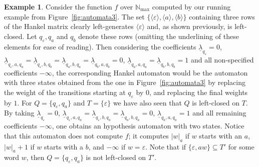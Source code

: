 \documentclass[10pt,a4paper]{amsart}
\theoremstyle{definition}
\newtheorem{exa}[thm]{Example}
\numberwithin{equation}{section}
\numberwithin{theorem}{section}
\begin{document}
 \begin{exa}
Consider the function $f$ over $\mathbb{N}_{\max}$ computed by our running example from Figure~\ref{fig:automata3}. The set $\{ \langle \varepsilon \rangle, \langle a \rangle, \langle b \rangle\}$ containing three rows of the Hankel matrix clearly left-generates $\langle \varepsilon \rangle$ and, as shown previously, is left-closed. Let $q_\varepsilon, q_a$ and $q_b$ denote these rows (omitting the underlining of these elements for ease of reading). Then considering the coefficients $\underline{\lambda}_{q_\varepsilon}=0$, $\underline{\lambda}_{q_\varepsilon,a,q_a} = \underline{\lambda}_{q_\varepsilon,b,q_b} = \underline{\lambda}_{q_a,b,q_a} = \underline{\lambda}_{q_b,a,q_b} = 0$, $\underline{\lambda}_{q_a,a, q_a} = \underline{\lambda}_{q_b,b,q_b} = 1$ and all non-specified coefficients $-\infty$, the corresponding Hankel automaton would be the automaton with three states obtained from the one in Figure~\ref{fig:automata3} by replacing the weight of the transitions starting at $q_{\varepsilon}$ by $0$, and replacing the final weights by $1$. For $Q = \{q_\varepsilon, q_ a\}$ and $T = \{\varepsilon\}$ we have also seen that $Q$ is left-closed on $T$. By taking $\underline{\lambda}_{q_\varepsilon}=0$, $\underline{\lambda}_{q_\varepsilon,a,q_a} = \underline{\lambda}_{q_\varepsilon,b,q_a} = \underline{\lambda}_{q_a,b,q_a} = 0$, $\underline{\lambda}_{q_a,a, q_a} = 1$ and all remaining coefficients $-\infty$, one obtains an hypothesis automaton with two states. Notice that this automaton does not compute $f$; it computes $|w|_a$ if $w$ starts with an $a$, $|w|_a + 1$ if $w$ starts with a $b$, and $-\infty$ if $w =\varepsilon$. Note that if $ \{\varepsilon, aw\} \subseteq T'$ for some word $w$, then $Q = \{q_\varepsilon, q_ a\}$ is not left-closed on $T'$. 
\end{exa}
\end{document}
